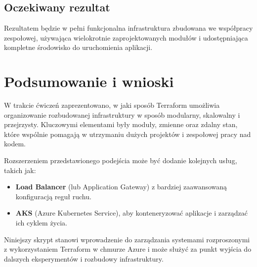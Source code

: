 \documentclass{article}
\begin{document}
\subsection{Oczekiwany rezultat}
Rezultatem będzie w pełni funkcjonalna infrastruktura zbudowana we współpracy zespołowej, używająca wielokrotnie zaprojektowanych modułów i udostępniająca kompletne środowisko do uruchomienia aplikacji.

\section{Podsumowanie i wnioski}
W trakcie ćwiczeń zaprezentowano, w jaki sposób Terraform umożliwia organizowanie rozbudowanej infrastruktury w sposób modularny, skalowalny i przejrzysty. Kluczowymi elementami były moduły, zmienne oraz zdalny stan, które wspólnie pomagają w utrzymaniu dużych projektów i zespołowej pracy nad kodem.

Rozszerzeniem przedstawionego podejścia może być dodanie kolejnych usług, takich jak:
\begin{itemize}
    \item \textbf{Load Balancer} (lub Application Gateway) z bardziej zaawansowaną konfiguracją reguł ruchu.
    \item \textbf{AKS} (Azure Kubernetes Service), aby konteneryzować aplikacje i zarządzać ich cyklem życia.
\end{itemize}

Niniejszy skrypt stanowi wprowadzenie do zarządzania systemami rozproszonymi z wykorzystaniem Terraform w chmurze Azure i może służyć za punkt wyjścia do dalszych eksperymentów i rozbudowy infrastruktury.
\end{document}
